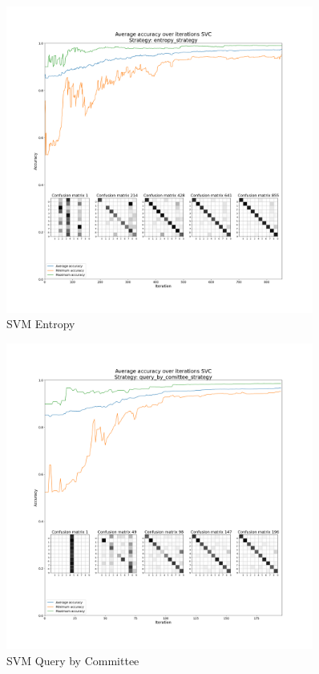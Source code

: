 \begin{figure}[htbp]
\centering
\includegraphics[width=0.9\textwidth]{resources/images/active_learning_SVC_entropy_strategy_average.png}
\caption{SVM Entropy}
\end{figure}

\begin{figure}[htbp]
\centering
\includegraphics[width=0.9\textwidth]{resources/images/active_learning_SVC_query_by_comittee_strategy_average.png}
\caption{SVM Query by Committee}
\end{figure}
